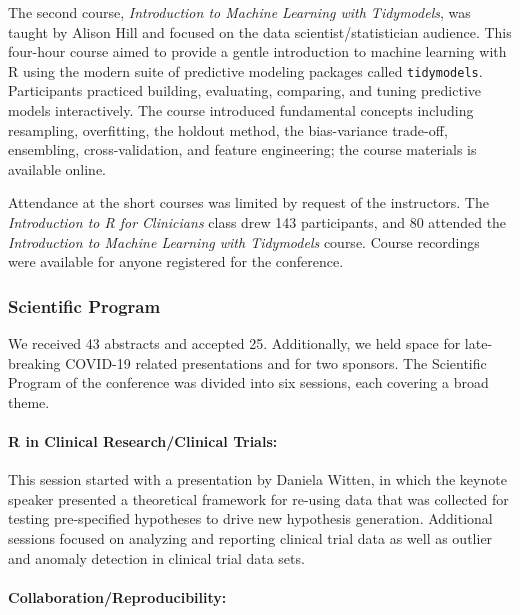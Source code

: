 The second course, \emph{Introduction to Machine Learning with
Tidymodels}, was taught by Alison Hill and focused on the data
scientist/statistician audience. This four-hour course aimed to provide
a gentle introduction to machine learning with R using the modern suite
of predictive modeling packages called \texttt{tidymodels}. Participants
practiced building, evaluating, comparing, and tuning predictive models
interactively. The course introduced fundamental concepts including
resampling, overfitting, the holdout method, the bias-variance
trade-off, ensembling, cross-validation, and feature engineering; the
course materials \citep{tidycourse} is available online.

Attendance at the short courses was limited by request of the
instructors. The \emph{Introduction to R for Clinicians} class drew 143
participants, and 80 attended the \emph{Introduction to Machine Learning
with Tidymodels} course. Course recordings were available for anyone
registered for the conference.

\hypertarget{scientific-program}{%
\subsubsection{Scientific Program}\label{scientific-program}}

We received 43 abstracts and accepted 25. Additionally, we held space
for late-breaking COVID-19 related presentations and for two sponsors.
The Scientific Program of the conference was divided into six sessions,
each covering a broad theme.

\hypertarget{r-in-clinical-researchclinical-trials}{%
\paragraph{R in Clinical Research/Clinical
Trials:}\label{r-in-clinical-researchclinical-trials}}

This session started with a presentation by Daniela Witten, in which the
keynote speaker presented a theoretical framework for re-using data that
was collected for testing pre-specified hypotheses to drive new
hypothesis generation. Additional sessions focused on analyzing and
reporting clinical trial data as well as outlier and anomaly detection
in clinical trial data sets.

\hypertarget{collaborationreproducibility}{%
\paragraph{Collaboration/Reproducibility:}\label{collaborationreproducibility}}

